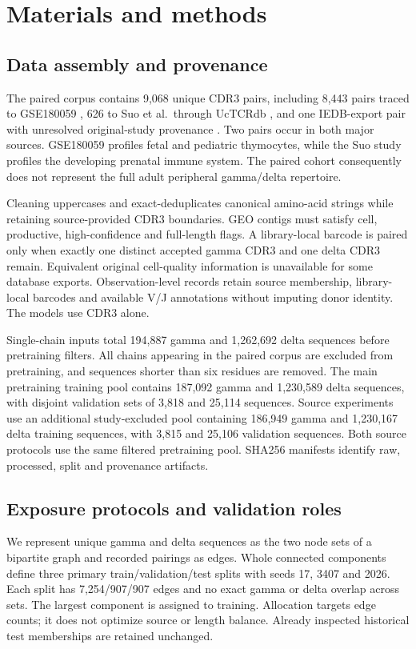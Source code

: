 \documentclass[10pt]{article}
\begin{document}
\section{Materials and methods}
\subsection{Data assembly and provenance}
The paired corpus contains 9,068 unique CDR3 pairs, including 8,443 pairs traced
to GSE180059 \cite{gse180059}, 626 to Suo et al.\ through UcTCRdb
\cite{suo2022,uctcrdb}, and one IEDB-export pair with unresolved original-study
provenance \cite{iedb}. Two pairs occur in both major sources. GSE180059 profiles
fetal and pediatric thymocytes, while the Suo study profiles the developing
prenatal immune system. The paired cohort consequently does not represent the
full adult peripheral gamma/delta repertoire.

Cleaning uppercases and exact-deduplicates canonical amino-acid strings while
retaining source-provided CDR3 boundaries. GEO contigs must satisfy cell,
productive, high-confidence and full-length flags. A library-local barcode is
paired only when exactly one distinct accepted gamma CDR3 and one delta CDR3
remain. Equivalent original cell-quality information is unavailable for some
database exports. Observation-level records retain source membership,
library-local barcodes and available V/J annotations without imputing donor
identity. The models use CDR3 alone.

Single-chain inputs total 194,887 gamma and 1,262,692 delta sequences before
pretraining filters. All chains appearing in the paired corpus are excluded
from pretraining, and sequences shorter than six residues are removed. The main
pretraining training pool contains 187,092 gamma and 1,230,589 delta sequences,
with disjoint validation sets of 3,818 and 25,114 sequences. Source experiments
use an additional study-excluded pool containing 186,949 gamma and 1,230,167
delta training sequences, with 3,815 and 25,106 validation sequences. Both source
protocols use the same filtered pretraining pool. SHA256 manifests identify raw,
processed, split and provenance artifacts.

\subsection{Exposure protocols and validation roles}
We represent unique gamma and delta sequences as the two node sets of a
bipartite graph and recorded pairings as edges. Whole connected components define
three primary train/validation/test splits with seeds 17, 3407 and 2026. Each
split has 7,254/907/907 edges and no exact gamma or delta overlap across sets.
The largest component is assigned to training. Allocation targets edge counts;
it does not optimize source or length balance. Already inspected historical
test memberships are retained unchanged.
\end{document}

